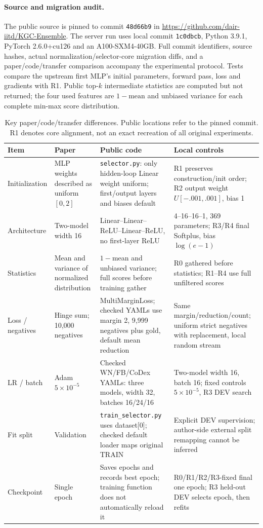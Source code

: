 \documentclass[11pt,a4paper]{article}
\begin{document}
\paragraph{Source and migration audit.}
The public source is pinned to commit \texttt{48d66b9} in \url{https://github.com/dair-iitd/KGC-Ensemble}. The server run uses local commit \texttt{1c0dbcb}, Python 3.9.1, PyTorch 2.6.0+cu126 and an A100-SXM4-40GB. Full commit identifiers, source hashes, actual normalization/selector-core migration diffs, and a paper/code/transfer comparison accompany the experimental protocol. Tests compare the upstream first MLP's initial parameters, forward pass, loss and gradients with R1. Public top-$k$ intermediate statistics are computed but not returned; the four used features are $1-\mathrm{mean}$ and unbiased variance for each complete min-max score distribution.

\begin{table}[htbp]
\centering\footnotesize
\caption{Key paper/code/transfer differences. Public locations refer to the pinned commit. R1 denotes core alignment, not an exact recreation of all original experiments.}
\label{tab:dyna-source}
\begin{tabularx}{\linewidth}{lXXX}
\toprule
Item & Paper & Public code & Local controls\\
\midrule
Initialization & MLP weights described as uniform $[0,2]$ & \texttt{selector.py}: only hidden-loop Linear weight uniform; first/output layers and biases default & R1 preserves construction/init order; R2 output weight $U[-.001,.001]$, bias 1\\
Architecture & Two-model width 16 & Linear--Linear--ReLU--Linear--ReLU, no first-layer ReLU & 4--16--16--1, 369 parameters; R3/R4 final Softplus, bias $\log(e-1)$\\
Statistics & Mean and variance of normalized distribution & $1-$mean and unbiased variance; full scores before training gather & R0 gathered before statistics; R1--R4 use full unfiltered scores\\
Loss / negatives & Hinge sum; 10,000 negatives & MultiMarginLoss; checked YAMLs use margin 2, 9,999 negatives plus gold, default mean reduction & Same margin/reduction/count; uniform strict negatives with replacement, local random stream\\
LR / batch & Adam $5\times10^{-5}$ & Checked WN/FB/CoDex YAMLs: three models, width 32, batches 16/24/16 & Two-model width 16, batch 16; fixed controls $5\times10^{-5}$, R3 DEV search\\
Fit split & Validation & \texttt{train\_selector.py} uses dataset[0]; checked default loader maps original TRAIN & Explicit DEV supervision; author-side external split remapping cannot be inferred\\
Checkpoint & Single epoch & Saves epochs and records best epoch; training function does not automatically reload it & R0/R1/R2/R3-fixed final one epoch; R3 held-out DEV selects epoch, then refits\\
\bottomrule
\end{tabularx}
\end{table}
\end{document}

